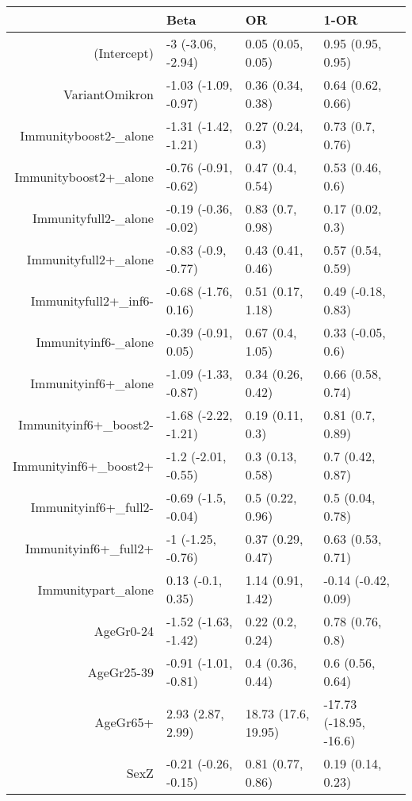 \begin{table}[ht]
\centering
\begin{tabular}{rlll}
  \hline
 & Beta & OR & 1-OR \\ 
  \hline
(Intercept) & -3 (-3.06, -2.94) & 0.05 (0.05, 0.05) & 0.95 (0.95, 0.95) \\ 
  VariantOmikron & -1.03 (-1.09, -0.97) & 0.36 (0.34, 0.38) & 0.64 (0.62, 0.66) \\ 
  Immunityboost2-\_alone & -1.31 (-1.42, -1.21) & 0.27 (0.24, 0.3) & 0.73 (0.7, 0.76) \\ 
  Immunityboost2+\_alone & -0.76 (-0.91, -0.62) & 0.47 (0.4, 0.54) & 0.53 (0.46, 0.6) \\ 
  Immunityfull2-\_alone & -0.19 (-0.36, -0.02) & 0.83 (0.7, 0.98) & 0.17 (0.02, 0.3) \\ 
  Immunityfull2+\_alone & -0.83 (-0.9, -0.77) & 0.43 (0.41, 0.46) & 0.57 (0.54, 0.59) \\ 
  Immunityfull2+\_inf6- & -0.68 (-1.76, 0.16) & 0.51 (0.17, 1.18) & 0.49 (-0.18, 0.83) \\ 
  Immunityinf6-\_alone & -0.39 (-0.91, 0.05) & 0.67 (0.4, 1.05) & 0.33 (-0.05, 0.6) \\ 
  Immunityinf6+\_alone & -1.09 (-1.33, -0.87) & 0.34 (0.26, 0.42) & 0.66 (0.58, 0.74) \\ 
  Immunityinf6+\_boost2- & -1.68 (-2.22, -1.21) & 0.19 (0.11, 0.3) & 0.81 (0.7, 0.89) \\ 
  Immunityinf6+\_boost2+ & -1.2 (-2.01, -0.55) & 0.3 (0.13, 0.58) & 0.7 (0.42, 0.87) \\ 
  Immunityinf6+\_full2- & -0.69 (-1.5, -0.04) & 0.5 (0.22, 0.96) & 0.5 (0.04, 0.78) \\ 
  Immunityinf6+\_full2+ & -1 (-1.25, -0.76) & 0.37 (0.29, 0.47) & 0.63 (0.53, 0.71) \\ 
  Immunitypart\_alone & 0.13 (-0.1, 0.35) & 1.14 (0.91, 1.42) & -0.14 (-0.42, 0.09) \\ 
  AgeGr0-24 & -1.52 (-1.63, -1.42) & 0.22 (0.2, 0.24) & 0.78 (0.76, 0.8) \\ 
  AgeGr25-39 & -0.91 (-1.01, -0.81) & 0.4 (0.36, 0.44) & 0.6 (0.56, 0.64) \\ 
  AgeGr65+ & 2.93 (2.87, 2.99) & 18.73 (17.6, 19.95) & -17.73 (-18.95, -16.6) \\ 
  SexZ & -0.21 (-0.26, -0.15) & 0.81 (0.77, 0.86) & 0.19 (0.14, 0.23) \\ 
   \hline
\end{tabular}
\end{table}
